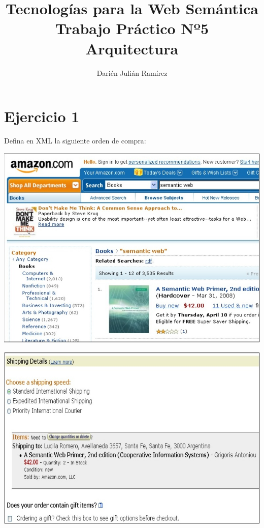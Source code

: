 \documentclass[a4paper,12pt,twoside,final,spanish]{article}
\title{\Huge Tecnologías para la Web Semántica\\
Trabajo Práctico Nº5\\
Arquitectura}
\author{Darién Julián Ramírez}
\date{\vspace{-5ex}}
\begin{document}
\maketitle %

\section*{Ejercicio 1}

Defina en XML la siguiente orden de compra:

\begin{center}
\includegraphics[width=0.9\linewidth,keepaspectratio]{1}
\end{center}

\begin{center}
\includegraphics[width=0.9\linewidth,keepaspectratio]{2}
\end{center}

\dotfill
\end{document}
